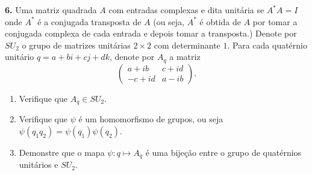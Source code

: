\documentclass{amsart}
\begin{document}
{\bf 6.} Uma matriz quadrada $A$ com entradas complexas e dita unitária se $A^*A=I$ onde $A^*$ é a conjugada transposta de $A$ (ou seja, $A^*$ é obtida de $A$ por tomar a conjugada complexa de cada entrada e depois 
tomar a transposta.)  Denote por $SU_2$ o grupo de matrizes unitárias $2\times 2$ com determinante $1$. 
Para cada quatérnio unitário $q=a+bi+cj+dk$, denote por $A_q$ a matriz 
\[
\begin{pmatrix} a+ib & c+id \\ -c+id & a-ib\end{pmatrix}.
\]
\begin{enumerate}
\item Verifique que $A_q\in SU_2$.
    \item   Verifique que $\psi$ é um homomorfismo de grupos, ou seja $\psi(q_1q_2)=\psi(q_1)\psi(q_2)$. 
    \item Demonstre que o mapa $\psi: q\mapsto A_q$ é uma bijeção entre o grupo de quatérnios unitários e 
    $SU_2$.
\end{enumerate}
\end{document}
